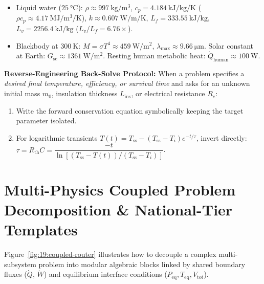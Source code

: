 \begin{twocol}[0.51]
\begin{formulacard}
\begin{itemize}
  \item Liquid water ($\SI{25}{\celsius}$): $\rho \approx \SI{997}{\kilogram\per\cubic\meter}$, $c_p = \SI{4.184}{\kilo\joule\per\kilogram\per\kelvin}$ ($\rho c_p \approx \SI{4.17}{\mega\joule\per\cubic\meter\per\kelvin}$), $k \approx \SI{0.607}{\watt\per\meter\per\kelvin}$, $L_f = \SI{333.55}{\kilo\joule\per\kilogram}$, $L_v = \SI{2256.4}{\kilo\joule\per\kilogram}$ ($L_v/L_f = 6.76\times$).
  \item Blackbody at $\SI{300}{\kelvin}$: $M = \sigma T^4 \approx \SI{459}{\watt\per\square\meter}$, $\lambda_{\max} \approx \SI{9.66}{\micro\meter}$. Solar constant at Earth: $G_{\mathrm{sc}} \approx \SI{1361}{\watt\per\square\meter}$. Resting human metabolic heat: $\dot{Q}_{\mathrm{human}} \approx \SI{100}{\watt}$.
\end{itemize}
\textbf{Reverse-Engineering Back-Solve Protocol:}
When a problem specifies a \emph{desired final temperature, efficiency, or survival time} and asks for an unknown initial mass $m_0$, insulation thickness $L_{\mathrm{ins}}$, or electrical resistance $R_e$:
\begin{enumerate}
  \item Write the forward conservation equation symbolically keeping the target parameter isolated.
  \item For logarithmic transients $T(t) = T_{\mathrm{ss}} - (T_{\mathrm{ss}}-T_i)e^{-t/\tau}$, invert directly: $\tau = R_{\mathrm{th}}C = \dfrac{-t}{\ln[(T_{\mathrm{ss}}-T(t))/(T_{\mathrm{ss}}-T_i)]}$.
\end{enumerate}
\end{formulacard}
\end{twocol}

\section{Multi-Physics Coupled Problem Decomposition \& National-Tier Templates}\label{sec:19.3}

Figure~\ref{fig:19:coupled-router} illustrates how to decouple a complex multi-subsystem problem into modular algebraic blocks linked by shared boundary fluxes ($\dot{Q}$, $\dot{W}$) and equilibrium interface conditions ($P_{\mathrm{eq}}, T_{\mathrm{eq}}, V_{\mathrm{tot}}$).

